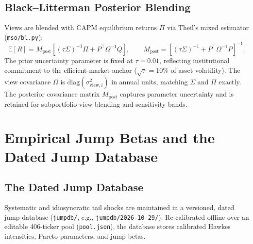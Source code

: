 \documentclass[11pt]{article}
\newcommand{\E}{\mathbb{E}}
\begin{document}
\subsection{Black--Litterman Posterior Blending}
Views are blended with CAPM equilibrium returns $\Pi$ via Theil's mixed estimator (\texttt{mso/bl.py}):
\begin{equation}
\E[R] = M_{\mathrm{post}} \left[(\tau\Sigma)^{-1}\Pi + P^{\top}\Omega^{-1}Q\right], \qquad
M_{\mathrm{post}} = \left[(\tau\Sigma)^{-1} + P^{\top}\Omega^{-1}P\right]^{-1}.
\end{equation}
The prior uncertainty parameter is fixed at $\tau = 0.01$, reflecting institutional commitment to the
efficient-market anchor ($\sqrt{\tau} = 10\%$ of asset volatility). The view covariance $\Omega$ is
$\mathrm{diag}(\sigma_{\mathrm{view}, i}^2)$ in annual units, matching $\Sigma$ and $\Pi$ exactly.
The posterior covariance matrix $M_{\mathrm{post}}$ captures parameter uncertainty and is retained for
subportfolio view blending and sensitivity bands.

\section{Empirical Jump Betas and the Dated Jump Database}
\subsection{The Dated Jump Database}
Systematic and idiosyncratic tail shocks are maintained in a versioned, dated jump database (\texttt{jumpdb/},
e.g., \texttt{jumpdb/2026-10-29/}). Re-calibrated offline over an editable 406-ticker pool (\texttt{pool.json}),
the database stores calibrated Hawkes intensities, Pareto parameters, and jump betas.
\end{document}
